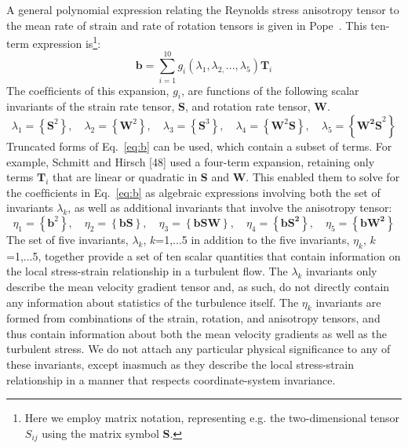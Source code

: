 A general polynomial expression relating the Reynolds stress anisotropy tensor to the mean rate of strain
and rate of rotation tensors is given in Pope~\cite{pope1975more}. This ten-term expression is\footnote{ Here we employ matrix notation, representing e.g. the two-dimensional tensor $S_{ij}$ using the matrix symbol \textbf{S}.}:
%
\begin{equation}
\boldsymbol{b}=\sum_{i=1}^{10}g_{i}\left(\lambda_{1},\lambda_{2,}...,\lambda_{5}\right)\boldsymbol{T}_{i}
\label{eq:b}
\end{equation}
%
The coefﬁcients of this expansion, $g_{i}$, are functions of the following scalar invariants of the strain rate tensor, \textbf{S}, and rotation rate tensor, \textbf{W}.
%
\begin{equation}
\lambda_{1}=\left\{ \boldsymbol{S}^{2}\right\} ,\quad\lambda_{2}=\left\{ \boldsymbol{W}^{2}\right\} ,\quad\lambda_{3}=\left\{ \boldsymbol{S}^{3}\right\} ,\quad\lambda_{4}=\left\{ \boldsymbol{W}^{2}\boldsymbol{S}\right\} ,\quad\lambda_{5}=\left\{ \boldsymbol{W^{2}S}^{2}\right\} \label{eq:lambdas}
\end{equation}
%
Truncated forms of Eq.~\ref{eq:b} can be used, which contain a subset of terms. For example, Schmitt and
Hirsch [48] used a four-term expansion, retaining only terms $\boldsymbol{T}_{i}$ that are linear or quadratic in \textbf{S} and \textbf{W}. This enabled them to solve for the coefﬁcients in Eq.~\ref{eq:b} as algebraic expressions involving both the set of invariants $\lambda_k$, as well as additional invariants that involve the anisotropy tensor:
%
\begin{equation}
\eta_{1}=\left\{ \boldsymbol{b}^{2}\right\} ,\quad\eta_{2}=\left\{ \boldsymbol{bS}\right\} ,\quad\eta_{3}=\left\{ \boldsymbol{b}\boldsymbol{\boldsymbol{S}W}\right\} ,\quad\eta_{4}=\left\{ \boldsymbol{b}\boldsymbol{S^{2}}\right\} ,\quad\eta_{5}=\left\{ \boldsymbol{bW^{2}}\right\} 
\label{eq:etas}
\end{equation}
%
The set of ﬁve invariants, $\lambda_k$, $k$=1,...5 in addition to the ﬁve invariants, $\eta_k$, $k$=1,...5, together provide a set of ten scalar quantities that contain information on the local stress-strain relationship in a turbulent ﬂow. The $\lambda_k$ invariants only describe the mean velocity gradient tensor and, as such, do not directly contain any information about statistics of the turbulence itself. The $\eta_k$ invariants are formed from combinations of the strain, rotation, and anisotropy tensors, and thus contain information about both the mean velocity gradients as well as the turbulent stress. We do not attach any particular physical signiﬁcance to any of these invariants, except inasmuch as they describe the local stress-strain relationship in a manner that respects coordinate-system invariance.

